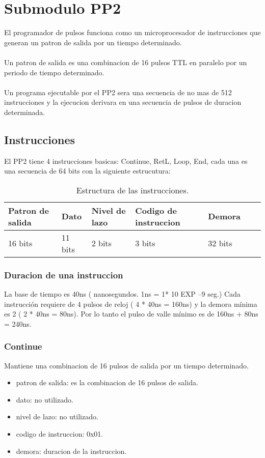 \section{Submodulo PP2}

El programador de pulsos funciona como un microprocesador de instrucciones que generan
un patron de salida por un tiempo determinado.
\\\\
Un patron de salida es una combinacion de 16 pulsos TTL en paralelo por un periodo 
de tiempo determinado.
\\\\
Un programa ejecutable por el PP2 sera una secuencia de no mas de 512 instrucciones 
y la ejecucion derivara en una secuencia de pulsos de duracion determinada.

\subsection{Instrucciones}

El PP2 tiene 4 instrucciones basicas: Continue, RetL, Loop, End, 
cada una es una secuencia de 64 bits con la siguiente estrucutura:\\
\begin{table}[ht]
    \centering
    \begin{tabular}{|l|l|l|l|l|l|l|}
    \hline
    Patron de salida  & Dato & Nivel de lazo & Codigo de instruccion & Demora \\
    \hline
    16 bits & 11 bits & 2 bits & 3 bits & 32 bits\\
    \hline
\end{tabular}
\caption{\label{tab:pp2_ins}Estructura de las instrucciones.}
\end{table}


\subsubsection{Duracion de una instruccion}
La base de tiempo es 40ns ( nanosegundos. 1ns = 1* 10 EXP –9 seg.) 
Cada instrucción requiere de 4 pulsos de reloj ( 4 * 40ns = 160ns) 
y la demora mínima es 2 ( 2 * 40ns = 80ns). Por lo tanto el pulso de
valle mínimo es de 160ns + 80ns = 240ns.

\subsubsection{Continue}
Mantiene una combinacion de 16 pulsos de salida por un tiempo determinado.
\begin{itemize}
    \item patron de salida: es la combinacion de 16 pulsos de salida.
    \item dato: no utilizado.
    \item nivel de lazo: no utilizado.
    \item codigo de instruccion: 0x01.
    \item demora: duracion de la instruccion.
\end{itemize}

